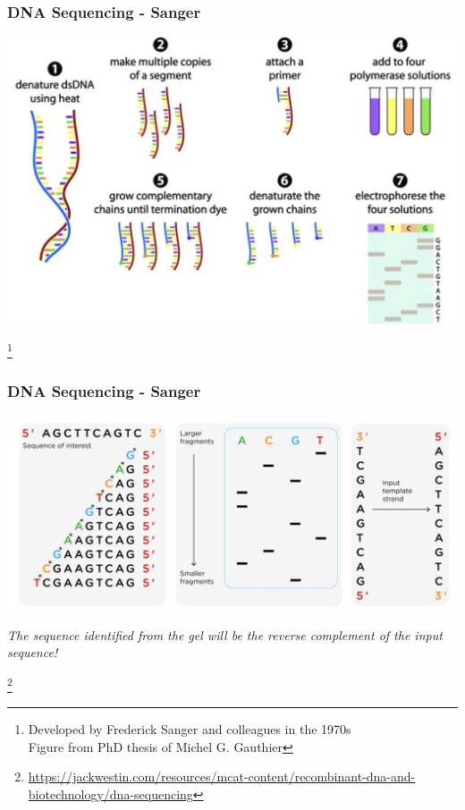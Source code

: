 \documentclass{beamer}
\newcommand\blfootnote[1]{%
	\begingroup
	\renewcommand\thefootnote{}\footnote{#1}%
	\addtocounter{footnote}{-1}%
	\endgroup
}
\begin{document}
\begin{frame}

\frametitle{DNA Sequencing - Sanger}


			\centering \includegraphics[keepaspectratio, width  =\textwidth]{img/sangerSequencing} 
			
			
\blfootnote{Developed by Frederick Sanger and colleagues in the 1970s
\\ Figure from PhD thesis of Michel G. Gauthier}
\end{frame}


\begin{frame}
	
	\frametitle{DNA Sequencing - Sanger}
	
	
	\centering \includegraphics[keepaspectratio, width  =\textwidth]{img/sanger} 
	
	\textit{The sequence identified from the gel will be the reverse complement of the input sequence!}
	
	\blfootnote{\url{https://jackwestin.com/resources/mcat-content/recombinant-dna-and-biotechnology/dna-sequencing}}
	



\end{frame}
\end{document}
